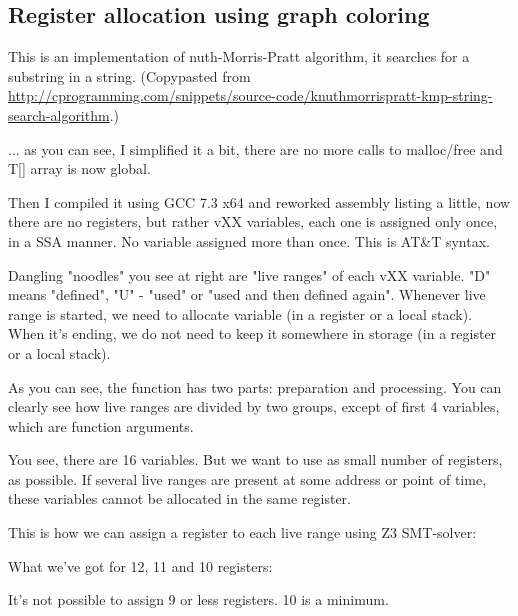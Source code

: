 \subsection{Register allocation using graph coloring}

\renewcommand{\CURPATH}{color/reg_alloc}

This is an implementation of nuth-Morris-Pratt algorithm, it searches for a substring in a string.
(Copypasted from \url{http://cprogramming.com/snippets/source-code/knuthmorrispratt-kmp-string-search-algorithm}.)



... as you can see, I simplified it a bit, there are no more calls to malloc/free and T[] array is now global.

Then I compiled it using GCC 7.3 x64 and reworked assembly listing a little, now there are no registers, but rather vXX variables, each one is assigned only once,
in a \ac{SSA} manner. No variable assigned more than once. This is AT\&T syntax.

%


Dangling "noodles" you see at right are "live ranges" of each vXX variable. "D" means "defined", "U" - "used" or "used and then defined again".
Whenever live range is started, we need to allocate variable (in a register or a local stack).
When it's ending, we do not need to keep it somewhere in storage (in a register or a local stack).

As you can see, the function has two parts: preparation and processing.
You can clearly see how live ranges are divided by two groups, except of first 4 variables, which are function arguments.

You see, there are 16 variables. But we want to use as small number of registers, as possible.
If several live ranges are present at some address or point of time, these variables cannot be allocated in the same register.

This is how we can assign a register to each live range using Z3 SMT-solver:



What we've got for 12, 11 and 10 registers:



It's not possible to assign 9 or less registers. 10 is a minimum.

